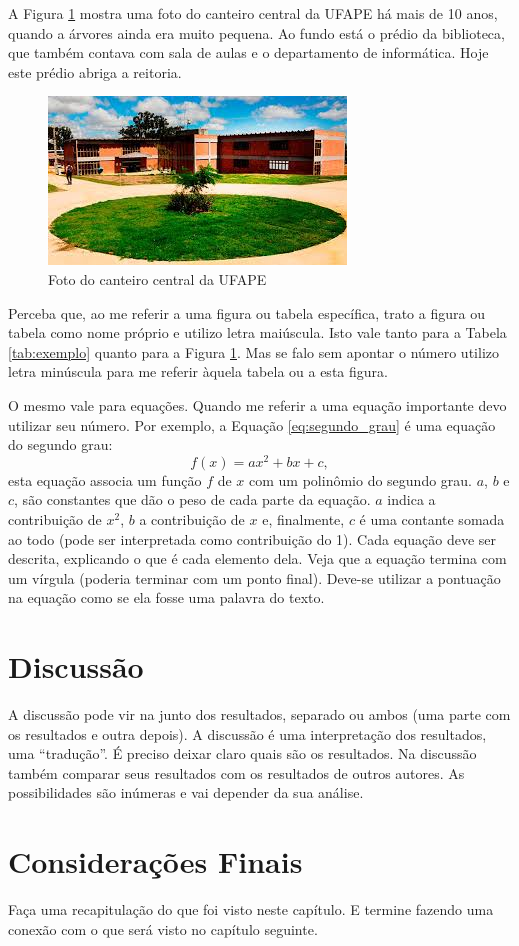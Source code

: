 A Figura \ref{fig:foto} mostra uma foto do canteiro central da UFAPE há mais de 10 anos, quando a árvores ainda era muito pequena. Ao fundo está o prédio da biblioteca, que também contava com sala de aulas e o departamento de informática. Hoje este prédio abriga a reitoria.

\begin{figure}[!htb]
\centering
\caption{Foto do canteiro central da UFAPE}
\label{fig:foto}
\includegraphics{images/ufape.jpeg}
\end{figure}

Perceba que, ao me referir a uma figura ou tabela específica, trato a figura ou tabela como nome próprio e utilizo letra maiúscula. Isto vale tanto para a Tabela \ref{tab:exemplo} quanto para a Figura \ref{fig:foto}. Mas se falo sem apontar o número utilizo letra minúscula para me referir àquela tabela ou a esta figura.

O mesmo vale para equações. Quando me referir a uma equação importante devo utilizar seu número. Por exemplo, a Equação \ref{eq:segundo_grau} é uma equação do segundo grau:
\begin{equation}
f(x) = ax^2 + bx + c,
\label{eq:segundo_grau}
\end{equation}
esta equação associa um função $f$ de $x$ com um polinômio do segundo grau. $a$, $b$ e $c$, são constantes que dão o peso de cada parte da equação. $a$ indica a contribuição de $x^2$, $b$ a contribuição de $x$ e, finalmente, $c$ é uma contante somada ao todo (pode ser interpretada como contribuição do 1).
Cada equação deve ser descrita, explicando o que é cada elemento dela.
Veja que a equação termina com um vírgula (poderia terminar com um ponto final). Deve-se utilizar a pontuação na equação como se ela fosse uma palavra do texto.

\section{Discussão}
A discussão pode vir na junto dos resultados, separado ou ambos (uma parte com os resultados e outra depois). A discussão é uma interpretação dos resultados, uma ``tradução''. É preciso deixar claro quais são os resultados. 
Na discussão também comparar seus resultados com os resultados de outros autores. As possibilidades são inúmeras e vai depender da sua análise.

\section{Considerações Finais}
Faça uma recapitulação do que foi visto neste capítulo. E termine fazendo uma conexão com o que será visto no capítulo seguinte.